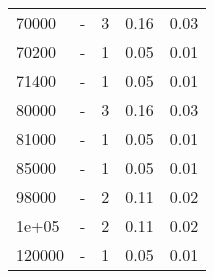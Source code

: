 \begin{longtable}{lXrrr}
        70000 & \multicolumn{1}{X}{-} & %
          \num{3} &
          \num[round-mode=places,round-precision=2]{0.16} &
          \num[round-mode=places,round-precision=2]{0.03} \\

        70200 & \multicolumn{1}{X}{-} & %
          \num{1} &
          \num[round-mode=places,round-precision=2]{0.05} &
          \num[round-mode=places,round-precision=2]{0.01} \\

        71400 & \multicolumn{1}{X}{-} & %
          \num{1} &
          \num[round-mode=places,round-precision=2]{0.05} &
          \num[round-mode=places,round-precision=2]{0.01} \\

        80000 & \multicolumn{1}{X}{-} & %
          \num{3} &
          \num[round-mode=places,round-precision=2]{0.16} &
          \num[round-mode=places,round-precision=2]{0.03} \\

        81000 & \multicolumn{1}{X}{-} & %
          \num{1} &
          \num[round-mode=places,round-precision=2]{0.05} &
          \num[round-mode=places,round-precision=2]{0.01} \\

        85000 & \multicolumn{1}{X}{-} & %
          \num{1} &
          \num[round-mode=places,round-precision=2]{0.05} &
          \num[round-mode=places,round-precision=2]{0.01} \\

        98000 & \multicolumn{1}{X}{-} & %
          \num{2} &
          \num[round-mode=places,round-precision=2]{0.11} &
          \num[round-mode=places,round-precision=2]{0.02} \\

        1e+05 & \multicolumn{1}{X}{-} & %
          \num{2} &
          \num[round-mode=places,round-precision=2]{0.11} &
          \num[round-mode=places,round-precision=2]{0.02} \\

        120000 & \multicolumn{1}{X}{-} & %
          \num{1} &
          \num[round-mode=places,round-precision=2]{0.05} &
          \num[round-mode=places,round-precision=2]{0.01} \\


\end{longtable}
